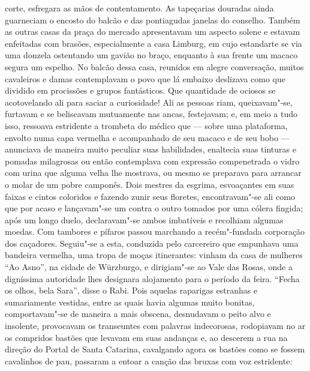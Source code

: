corte, esfregara as mãos de contentamento. As tapeçarias douradas ainda
guarneciam o encosto do balcão e das pontiagudas janelas do conselho.
Também as outras casas da praça do mercado apresentavam um aspecto
solene e estavam enfeitadas com brasões, especialmente a casa Limburg,
em cujo estandarte se via uma donzela ostentando um gavião no braço,
enquanto à sua frente um macaco segura um espelho. No balcão dessa
casa, reunidos em alegre conversação, muitos cavaleiros e damas
contemplavam o povo que lá embaixo deslizava como que dividido em
procissões e grupos fantásticos. Que quantidade de ociosos se
acotovelando ali para saciar a curiosidade! Ali as pessoas riam,
queixavam"-se, furtavam e se beliscavam mutuamente nas ancas,
festejavam; e, em meio a tudo isso, ressoava estridente a trombeta do
médico que --- sobre uma plataforma, envolto numa capa vermelha e
acompanhado de seu macaco e de seu bobo --- anunciava de maneira muito
peculiar suas habilidades, enaltecia suas tinturas e pomadas milagrosas
ou então contemplava com expressão compenetrada o vidro com urina que
alguma velha lhe mostrava, ou mesmo se preparava para arrancar o molar
de um pobre camponês. Dois mestres da esgrima, esvoaçantes em suas
faixas e cintos coloridos e fazendo zunir seus floretes,
encontravam"-se ali como que por acaso e lançavam"-se um contra o
outro tomados por uma cólera fingida; após um longo duelo,
declaravam"-se ambos imbatíveis e recolhiam algumas moedas. Com
tambores e pífaros passou marchando a recém"-fundada corporação dos
caçadores. Seguiu"-se a esta, conduzida pelo carcereiro que empunhava
uma bandeira vermelha, uma tropa de moças itinerantes: vinham da casa
de mulheres ``Ao Asno'', na cidade de Würzburgo, e dirigiam"-se ao Vale
das Rosas, onde a digníssima autoridade lhes designara alojamento para
o período da feira. ``Fecha os olhos, bela Sara'', disse o Rabi. Pois
aquelas raparigas estranhas e sumariamente vestidas, entre as quais
havia algumas muito bonitas, comportavam"-se de maneira a mais
obscena, desnudavam o peito alvo e insolente, provocavam os transeuntes
com palavras indecorosas, rodopiavam no ar os compridos bastões que
levavam em suas andanças e, ao descerem a rua na direção do Portal de
Santa Catarina, cavalgando agora os bastões como se fossem cavalinhos
de pau, passaram a entoar a canção das bruxas com voz estridente:

